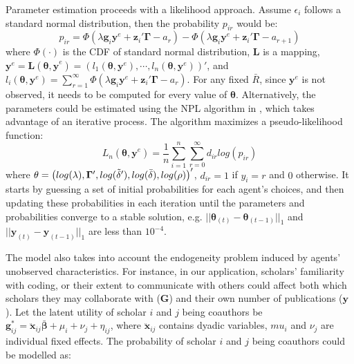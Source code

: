 Parameter estimation proceeds with a likelihood approach. Assume $\epsilon_i$ follows a standard normal distribution, then the probability $p_{ir}$ would be:
\begin{equation}
    \nonumber
    p_{ir} = \Phi\left( \lambda \mathbf{g}_i\mathbf{y}^e + \mathbf{z}_i'\mathbf{\Gamma} - a_r \right) - \Phi\left( \lambda \mathbf{g}_i\mathbf{y}^e + \mathbf{z}_i'\mathbf{\Gamma} - a_{r+1} \right)
\end{equation}
where $\Phi(\cdot)$ is the CDF of standard normal distribution, $\mathbf{L}$ is a mapping, $\mathbf{y}^e=\mathbf{L}(\mathbf{\theta,y}^e)=(l_1(\mathbf{\theta},\mathbf{y}^e),\cdots,l_n(\mathbf{\theta},\mathbf{y}^e))'$, and $l_i(\mathbf{\theta},\mathbf{y}^e)=\sum_{r=1}^\infty \Phi\left( \lambda \mathbf{g}_i\mathbf{y}^e + \mathbf{z}_i'\mathbf{\Gamma} - a_r \right)$. For any fixed $\bar{R}$, since $\mathbf{y}^e$ is not observed,
it needs to be computed for every value of $\mathbf{\theta}$. Alternatively, the parameters could be estimated using the NPL algorithm in \cite{aguirregabiria2007sequential}, which takes advantage of an iterative process. The algorithm maximizes a pseudo-likelihood function:
\begin{equation}
    \nonumber
    L_n\left(\mathbf{\theta,y}^e\right)=\frac{1}{n} \sum_{i=1}^n\sum_{r=0}^\infty d_{ir}log(p_{ir})
\end{equation}
where $\mathbf{\theta}=\left( log(\lambda), \mathbf{\Gamma}', log(\Tilde{\mathbf{\delta}}'),log(\bar{\delta}), log(\rho) \right)'$, $d_{ir}=1$ if $y_i=r$ and $0$ otherwise. It starts by guessing a set of initial probabilities for each agent's choices, and then updating these probabilities in each iteration until the parameters and probabilities converge to a stable solution, e.g. $||\mathbf{\theta}_{(t)}-\mathbf{\theta}_{(t-1)}||_1$ and $||\mathbf{y}_{(t)}-\mathbf{y}_{(t-1)}||_1$ are less than $10^{-4}$.

The model also takes into account the endogeneity problem induced by agents' unobserved characteristics. For instance, in our application, scholars' familiarity with coding, or their extent to communicate with others could affect both which scholars they may collaborate with ($\mathbf{G}$) and their own number of publications ($\mathbf{y}$). Let the latent utility of scholar $i$ and $j$ being coauthors be $\mathbf{g}_{ij}^*=\mathbf{\ddot{x}}_{ij}\mathbf{\bar{\beta}}+\mu_i+\nu_j+\eta_{ij}$, where $\mathbf{\ddot{x}}_{ij}$ contains dyadic variables, $mu_i$ and $\nu_j$ are individual fixed effects. The probability of scholar $i$ and $j$ being coauthors could be modelled as:

